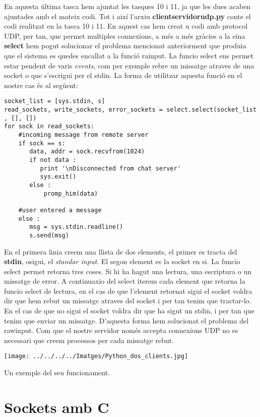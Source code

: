 \documentclass[11p]{article}
\begin{document}
En aquesta última tasca hem ajuntat les tasques 10 i 11, ja que les dues acaben ajuntades amb el mateix codi. Tot i així l'arxiu \textbf{client\textunderscore servidor\textunderscore udp.py} conte el codi realitzat en la tasca 10 i 11. 
\newline
En aquest cas hem creat u codi amb protocol UDP, per tan, que permet multiples connexions, a més a més gràcies a la eina \textbf{select} hem pogut solucionar el problema mencionat anteriorment que produia que el sistema es quedes encallat a la funció ra\textunderscore input.
\newline
La funcio select ens permet estar pendent de varis \textit{events}, com per exemple rebre un missatge atraves de una socket o que s'escrigui per el stdin. La forma de utilitzar aquesta funció en el nostre cas és al següent:
\begin{lstlisting}
socket_list = [sys.stdin, s]
read_sockets, write_sockets, error_sockets = select.select(socket_list , [], [])
for sock in read_sockets:
    #incoming message from remote server
    if sock == s:
       data, addr = sock.recvfrom(1024)
       if not data :
          print '\nDisconnected from chat server'
          sys.exit()
       else :
           promp_him(data)
         
    #user entered a message
    else :
       msg = sys.stdin.readline()
       s.send(msg)
\end{lstlisting}
En el primera linia creem una llista de dos elements, el primer es tracta del \textbf{stdin}, osigui, el \textit{standar input}. El segon element es la socket en si.
\newline
La funcio select permet retorna tres coses. Si hi ha hagut una lectura, una escriptura o un missatge de error. A continuaxio del select iterem cada element que retorna la funcio select de lectura, en el cas de que l'element retornat sigui el socket voldra dir que hem rebut un missatge atraves del socket i per tan tenim que tractar-lo. En el cas de que no sigui el socket voldra dir que ha sigut un stdin, i per tan que tenim que enviar un missatge.
\newline
D'aquesta forma hem solucionat el problema del raw\textunderscore input. Com que el nostre servidor només accepta connexions UDP no es necessari que creem processos per cada missatge rebut.
\newline
\centerline{\texttt{[image: ../../../../Imatges/Python\_dos\_clients.jpg]}} 
Un exemple del seu funcionament.
\newpage
\section{Sockets amb C}
\end{document}
